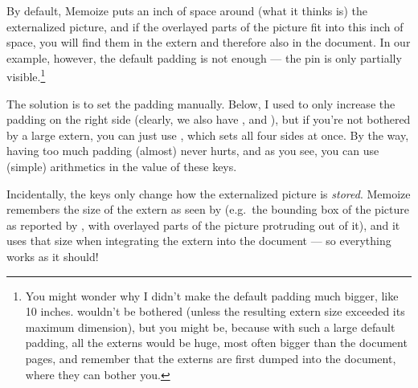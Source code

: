 \documentclass[a4paper,11pt]{article}
\begin{document}


By default, Memoize puts an inch of space around (what it thinks is) the
externalized picture, and if the overlayed parts of the picture fit into this
inch of space, you will find them in the extern and therefore also in the
document.  In our example, however, the default padding is not enough --- the
pin is only partially visible.\footnote{You might wonder why I didn't make the
  default padding much bigger, like 10 inches.   wouldn't be
  bothered (unless the resulting extern size exceeded its maximum dimension),
  but you might be, because with such a large default padding, all the externs
  would be huge, most often bigger than the document pages, and remember that
  the externs are first dumped into the document, where they can bother you.}


The solution is to set the padding manually.  Below, I used  to only increase the padding on the right side (clearly, we also have
,  and ), but
if you're not bothered by a large extern, you can just use
, which sets all four sides at once.  By the way, having
too much padding (almost) never hurts, and as you see, you can use (simple)
arithmetics in the value of these keys.


\enlargethispage{1ex} %
Incidentally, the  keys only change how
the externalized picture is \emph{stored}.  Memoize remembers the size of the
extern as seen by  (e.g.\ the bounding box of the picture as
reported by \TikZ, with overlayed parts of the picture protruding out of it),
and it uses that size when integrating the extern into the document --- so
everything works as it should!
\end{document}
